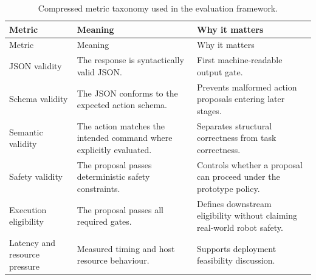 \begin{longtable}{p{}p{}p{}}
        \caption{Compressed metric taxonomy used in the evaluation framework.}
        \label{tab:compressed_metric_taxonomy}\\
        \toprule
        Metric & Meaning & Why it matters \\
        \midrule
        \endfirsthead
        \toprule
        Metric & Meaning & Why it matters \\
        \midrule
        \endhead
        JSON validity & The response is syntactically valid JSON. & First machine-readable output gate. \\
Schema validity & The JSON conforms to the expected action schema. & Prevents malformed action proposals entering later stages. \\
Semantic validity & The action matches the intended command where explicitly evaluated. & Separates structural correctness from task correctness. \\
Safety validity & The proposal passes deterministic safety constraints. & Controls whether a proposal can proceed under the prototype policy. \\
Execution eligibility & The proposal passes all required gates. & Defines downstream eligibility without claiming real-world robot safety. \\
Latency and resource pressure & Measured timing and host resource behaviour. & Supports deployment feasibility discussion. \\
        \bottomrule
        \end{longtable}
